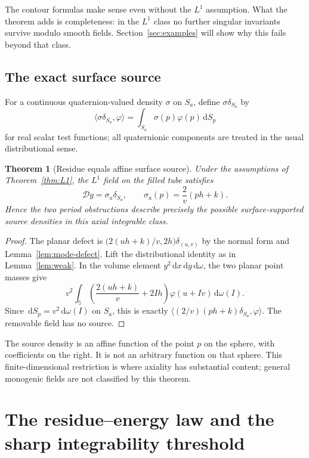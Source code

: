 \documentclass[11pt,a4paper]{article}
\numberwithin{equation}{section}
\newtheorem{theorem}{Theorem}[section]
\theoremstyle{definition}
\theoremstyle{remark}
\newcommand{\SSS}{\mathbb S}
\newcommand{\D}{\mathcal D}
\newcommand{\dd}{\,\mathrm d}
\begin{document}
The contour formulas make sense even without the $L^1$ assumption.
What the theorem adds is completeness: in the $L^1$ class no further
singular invariants survive modulo smooth fields. Section~\ref{sec:examples}
will show why this fails beyond that class.

\subsection{The exact surface source}
For a continuous quaternion-valued density $\sigma$ on $S_a$, define
$\sigma\delta_{S_a}$ by
\[
 \langle\sigma\delta_{S_a},\varphi\rangle
     =\int_{S_a}\sigma(p)\varphi(p)\dd S_p
\]
for real scalar test functions; all quaternionic components are treated
in the usual distributional sense.

\begin{theorem}[Residue equals affine surface source]\label{thm:source}
Under the assumptions of Theorem~\ref{thm:L1}, the $L^1$ field on the
filled tube satisfies
\begin{equation}\label{eq:surface-source}
 \boxed{\ \D g=\sigma_a\delta_{S_a},\qquad
       \sigma_a(p)=\frac2v(ph+k).\ }
\end{equation}
Hence the two period obstructions describe precisely the possible
surface-supported source densities in this axial integrable class.
\end{theorem}
\begin{proof}
The planar defect is
$\bigl(2(uh+k)/v,2h\bigr)\delta_{(u,v)}$ by the normal form and
Lemma~\ref{lem:mode-defect}. Lift the distributional identity as in
Lemma~\ref{lem:weak}. In the volume element
$y^2\dd x\dd y\dd\omega$, the two planar point masses give
\[
 v^2\int_{\SSS}\left(\frac{2(uh+k)}v+2Ih\right)
                    \varphi(u+Iv)\dd\omega(I).
\]
Since $\dd S_p=v^2\dd\omega(I)$ on $S_a$, this is exactly
$\langle(2/v)(ph+k)\delta_{S_a},\varphi\rangle$. The removable field
has no source.
\end{proof}

The source density is an affine function of the point $p$ on the
sphere, with coefficients on the right. It is not an arbitrary function
on that sphere. This finite-dimensional restriction is where axiality
has substantial content; general monogenic fields are not classified
by this theorem.

\section{The residue--energy law and the sharp integrability threshold}
\label{sec:energy}
\end{document}
